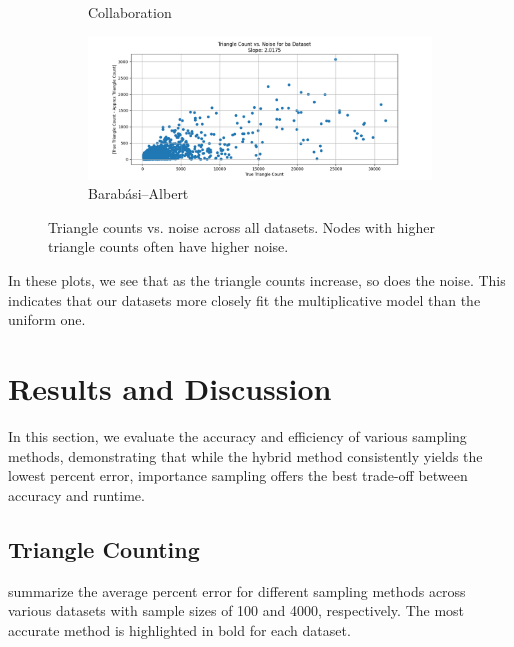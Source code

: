 \documentclass[11pt, margin=1in]{article}
\begin{document}
\begin{figure}[H]
\begin{subfigure}[b]{0.49\textwidth}
        \caption{Collaboration}
        \label{fig:tri_vs_noise_GrQc}
    \end{subfigure}
    \hfill
    \begin{subfigure}[b]{0.49\textwidth}
        \centering
        \includegraphics[width=\textwidth]{plots/triangle-counts-vs-noise/ba_triangle_count_vs_noise.png}
        \caption{Barabási–Albert}
        \label{fig:tri_vs_noise_ba}
    \end{subfigure}

    \caption{Triangle counts vs. noise across all datasets. Nodes with higher triangle counts often have higher noise.}
    \label{fig:tri_vs_noise}
\end{figure}

In these plots, we see that as the triangle counts increase, so does the noise.
This indicates that our datasets more closely fit the multiplicative model than the uniform one.

\newpage

\section{Results and Discussion}

In this section, we evaluate the accuracy and efficiency of various sampling methods, demonstrating that while the hybrid method consistently yields the lowest percent error, importance sampling offers the best trade-off between accuracy and runtime.

\subsection{Triangle Counting}

 summarize the average percent error for different sampling methods across various datasets with sample sizes of 100 and 4000, respectively.
The most accurate method is highlighted in bold for each dataset.
\end{document}
